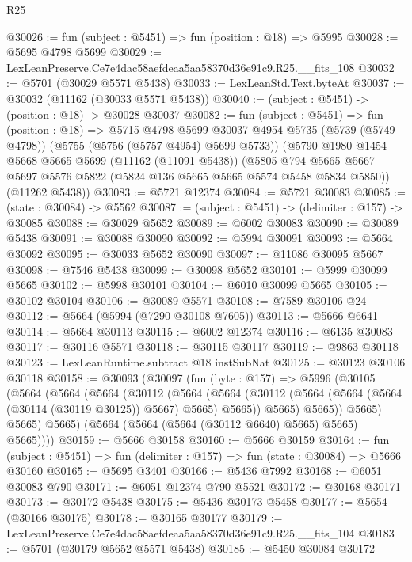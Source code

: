 \begin{lexlean}{R25}
\begin{coremodule}
@30026 := fun (subject : @5451) => fun (position : @18) => @5995
@30028 := @5695 @4798 @5699
@30029 := LexLeanPreserve.Ce7e4dac58aefdeaa5aa58370d36e91c9.R25.__fits_108
@30032 := @5701 (@30029 @5571 @5438)
@30033 := LexLeanStd.Text.byteAt
@30037 := @30032 (@11162 (@30033 @5571 @5438))
@30040 := (subject : @5451) -> (position : @18) -> @30028 @30037
@30082 := fun (subject : @5451) =>
  fun (position : @18) =>
  @5715
    @4798
    @5699
    @30037
    @4954
    @5735
    (@5739 (@5749 @4798))
    (@5755 (@5756 (@5757 @4954) @5699 @5733))
    (@5790
      @1980
      @1454
      @5668
      @5665
      @5699
      (@11162 (@11091 @5438))
      (@5805 @794 @5665 @5667 @5697 @5576 @5822 (@5824 @136 @5665 @5665 @5574 @5458 @5834 @5850))
      (@11262 @5438))
@30083 := @5721 @12374
@30084 := @5721 @30083
@30085 := (state : @30084) -> @5562
@30087 := (subject : @5451) -> (delimiter : @157) -> @30085
@30088 := @30029 @5652
@30089 := @6002 @30083
@30090 := @30089 @5438
@30091 := @30088 @30090
@30092 := @5994 @30091
@30093 := @5664 @30092
@30095 := @30033 @5652 @30090
@30097 := @11086 @30095 @5667
@30098 := @7546 @5438
@30099 := @30098 @5652
@30101 := @5999 @30099 @5665
@30102 := @5998 @30101
@30104 := @6010 @30099 @5665
@30105 := @30102 @30104
@30106 := @30089 @5571
@30108 := @7589 @30106 @24
@30112 := @5664 (@5994 (@7290 @30108 @7605))
@30113 := @5666 @6641
@30114 := @5664 @30113
@30115 := @6002 @12374
@30116 := @6135 @30083
@30117 := @30116 @5571
@30118 := @30115 @30117
@30119 := @9863 @30118
@30123 := LexLeanRuntime.subtract @18 instSubNat
@30125 := @30123 @30106 @30118
@30158 := @30093
    (@30097
      (fun (byte : @157) =>
      @5996
        (@30105
          (@5664
            (@5664
              (@5664
                (@30112
                  (@5664
                    (@5664
                      (@30112 (@5664 (@5664 (@5664 (@30114 (@30119 @30125)) @5667) @5665) @5665))
                      @5665)
                    @5665))
                @5665)
              @5665)
            @5665)
          (@5664 (@5664 (@5664 (@30112 @6640) @5665) @5665) @5665))))
@30159 := @5666 @30158
@30160 := @5666 @30159
@30164 := fun (subject : @5451) => fun (delimiter : @157) => fun (state : @30084) => @5666 @30160
@30165 := @5695 @3401
@30166 := @5436 @7992
@30168 := @6051 @30083 @790
@30171 := @6051 @12374 @790 @5521
@30172 := @30168 @30171
@30173 := @30172 @5438
@30175 := @5436 @30173 @5458
@30177 := @5654 (@30166 @30175)
@30178 := @30165 @30177
@30179 := LexLeanPreserve.Ce7e4dac58aefdeaa5aa58370d36e91c9.R25.__fits_104
@30183 := @5701 (@30179 @5652 @5571 @5438)
@30185 := @5450 @30084 @30172

\end{coremodule}
\end{lexlean}
